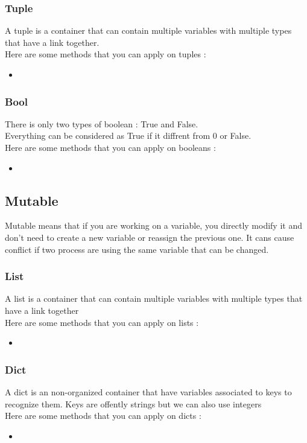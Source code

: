 \documentclass[a4paper, 12pt]{article}
\begin{document}
\subsubsection{Tuple}
A tuple is a container that can contain multiple variables with multiple types that have a link together. \\
Here are some methods that you can apply on tuples : 
\begin{itemize}
\item
\end{itemize}

\subsubsection{Bool}
\label{subsec:Bool}
There is only two types of boolean : True and False. \\
Everything can be considered as True if it diffrent from 0 or False. \\
Here are some methods that you can apply on booleans : 
\begin{itemize}
\item
\end{itemize}

\subsection{Mutable}
Mutable means that if you are working on a variable, you directly modify it and don't need to create a new variable or reassign the previous one. It cans cause conflict if two process are using the same variable that can be changed.\newline

\subsubsection{List}
A list is a container that can contain multiple variables with multiple types that have a link together\\
Here are some methods that you can apply on lists : 
\begin{itemize}
\item
\end{itemize}

\subsubsection{Dict}
A dict is an non-organized container that have variables associated to keys to recognize them. Keys are offently strings but we can also use integers\\
Here are some methods that you can apply on dicts : 
\begin{itemize}
\item
\end{itemize}
\end{document}
